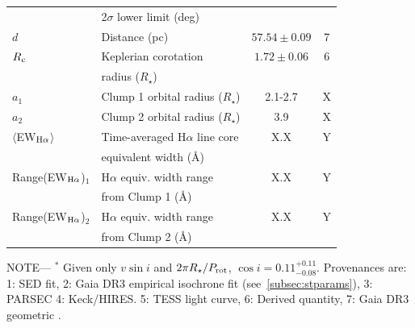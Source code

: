 \documentclass{nature3}
\begin{document}
\begin{table}
\begin{tabular}{llcc}
                                        & \hspace{3pt}  2$\sigma$ lower limit (deg)	                     &                      \\
%
$d$\dotfill                             & Distance (pc)\dotfill                                          & $57.54 \pm 0.09$   & 7 \\
%
$R_{\rm c}$\dotfill		                  & Keplerian corotation\dotfill                                   & $1.72 \pm 0.06$  & 6 \\
                                        & \hspace{3pt} radius ($R_\star$)	                               &                      \\
%
$a_1$\dotfill                           & Clump 1 orbital radius ($R_\star$)\hspace{9pt}\dotfill         &  2.1-2.7         & X \\
$a_2$\dotfill                           & Clump 2 orbital radius ($R_\star$)\hspace{9pt}\dotfill         &  3.9             & X \\
%
$\langle$EW$_{\rm H\alpha}$$\rangle$    & Time-averaged H$\alpha$ line core                              &  X.X             & Y \\ 
                                        & \hspace{3pt} equivalent width (\AA)	                           &                      \\
Range(EW$_{\rm H\alpha}$)$_1$           & H$\alpha$ equiv. width range                                   &  X.X             & Y \\ 
                                        & \hspace{3pt} from Clump 1 (\AA)	                               &                      \\
Range(EW$_{\rm H\alpha}$)$_2$           & H$\alpha$ equiv. width range                                   &  X.X             & Y \\ 
                                        & \hspace{3pt} from Clump 2 (\AA)	                               &                      \\
\hline
\end{tabular}
\begin{flushleft}
\footnotesize{ \textsc{NOTE}---
$^*$ Given only $v\sin i$ and $2\pi R_\star/P_{\rm rot}$, $\cos i=0.11^{+0.11}_{-0.08}$.
Provenances are:
1: SED fit\cite{Bouma2024},
2: Gaia DR3 empirical isochrone fit (see~\ref{subsec:stparams}),
3: PARSEC %
4: Keck/HIRES.
5: TESS light curve,
6: Derived quantity,
7: Gaia DR3 geometric \cite{GaiaDR3}.
}
\end{flushleft}
\vspace{-0.5cm}
\end{table}
\end{document}
